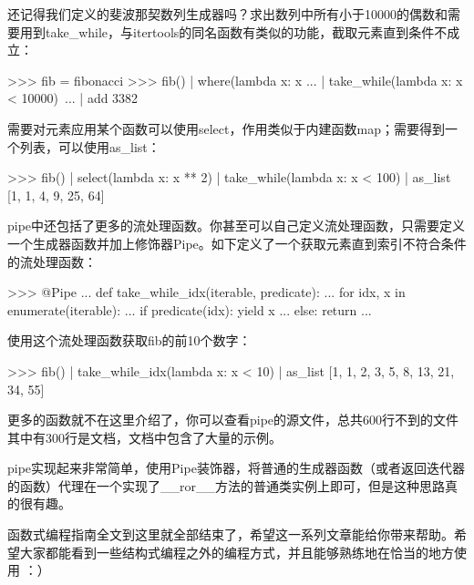 \documentclass[12pt,a4paper]{report}
\begin{document}
还记得我们定义的斐波那契数列生成器吗？求出数列中所有小于10000的偶数和需要用到take\_while，与itertools的同名函数有类似的功能，截取元素直到条件不成立：
        \begin{python}[moreemph={[4]42},caption={},label=ex1]
>>> fib = fibonacci
>>> fib() | where(lambda x: x %
...       | take_while(lambda x: x < 10000)\
...       | add
3382
        \end{python}

需要对元素应用某个函数可以使用select，作用类似于内建函数map；需要得到一个列表，可以使用as\_list：
        \begin{python}[moreemph={[4]42},caption={},label=ex1]
>>> fib() | select(lambda x: x ** 2) | take_while(lambda x: x < 100) | as_list
[1, 1, 4, 9, 25, 64]
        \end{python}

pipe中还包括了更多的流处理函数。你甚至可以自己定义流处理函数，只需要定义一个生成器函数并加上修饰器Pipe。如下定义了一个获取元素直到索引不符合条件的流处理函数：
        \begin{python}[moreemph={[4]42},caption={},label=ex1]
>>> @Pipe
... def take_while_idx(iterable, predicate):
...   for idx, x in enumerate(iterable):
...     if predicate(idx): yield x
...     else: return
...
        \end{python}

使用这个流处理函数获取fib的前10个数字：
        \begin{python}[moreemph={[4]42},caption={},label=ex1]
>>> fib() | take_while_idx(lambda x: x < 10) | as_list
[1, 1, 2, 3, 5, 8, 13, 21, 34, 55]
        \end{python}

更多的函数就不在这里介绍了，你可以查看pipe的源文件，总共600行不到的文件其中有300行是文档，文档中包含了大量的示例。

pipe实现起来非常简单，使用Pipe装饰器，将普通的生成器函数（或者返回迭代器的函数）代理在一个实现了\_\_ror\_\_方法的普通类实例上即可，但是这种思路真的很有趣。

函数式编程指南全文到这里就全部结束了，希望这一系列文章能给你带来帮助。希望大家都能看到一些结构式编程之外的编程方式，并且能够熟练地在恰当的地方使用 ：）
\end{document}
